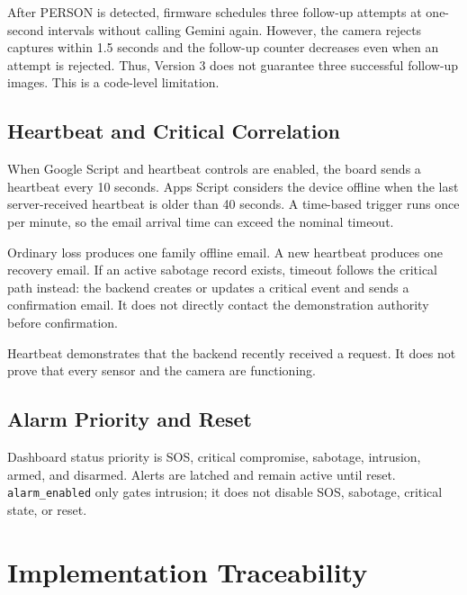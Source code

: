 \documentclass[11pt,a4paper]{report}
\begin{document}
After PERSON is detected, firmware schedules three follow-up attempts at
one-second intervals without calling Gemini again. However, the camera rejects
captures within 1.5 seconds and the follow-up counter decreases even when an
attempt is rejected. Thus, Version 3 does not guarantee three successful
follow-up images. This is a code-level limitation.

\section{Heartbeat and Critical Correlation}
When Google Script and heartbeat controls are enabled, the board sends a
heartbeat every 10 seconds. Apps Script considers the device offline when the
last server-received heartbeat is older than 40 seconds. A time-based trigger
runs once per minute, so the email arrival time can exceed the nominal timeout.

Ordinary loss produces one family offline email. A new heartbeat produces one
recovery email. If an active sabotage record exists, timeout follows the
critical path instead: the backend creates or updates a critical event and
sends a confirmation email. It does not directly contact the demonstration
authority before confirmation.

Heartbeat demonstrates that the backend recently received a request. It does
not prove that every sensor and the camera are functioning.

\section{Alarm Priority and Reset}
Dashboard status priority is SOS, critical compromise, sabotage, intrusion,
armed, and disarmed. Alerts are latched and remain active until reset.
\texttt{alarm\_enabled} only gates intrusion; it does not disable SOS,
sabotage, critical state, or reset.

\chapter{Implementation Traceability}
\end{document}
